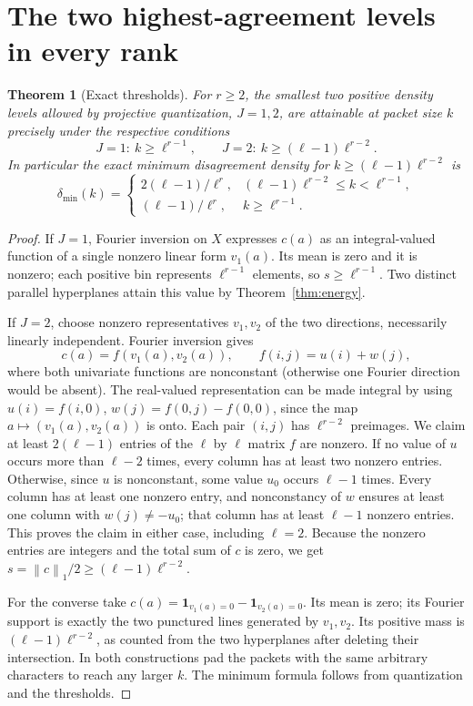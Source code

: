 \documentclass[11pt]{article}
\newtheorem{theorem}{Theorem}[section]
\theoremstyle{remark}\newtheorem{remark}[theorem]{Remark}
\newcommand{\1}{\mathbf 1}
\newcommand{\norm}[1]{\left\lVert#1\right\rVert}
\begin{document}
\section{The two highest-agreement levels in every rank}
\begin{theorem}[Exact thresholds]\label{thm:levels}
For $r\ge2$, the smallest two positive density levels allowed by projective quantization, $J=1,2$, are attainable at packet size $k$ precisely under the respective conditions
\[
 J=1:\ k\ge\ell^{r-1},\qquad
 J=2:\ k\ge(\ell-1)\ell^{r-2}.
\]
In particular the exact minimum disagreement density for $k\ge(\ell-1)\ell^{r-2}$ is
\[
 \delta_{\min}(k)=
 \begin{cases}
  2(\ell-1)/\ell^r,&(\ell-1)\ell^{r-2}\le k<\ell^{r-1},\\
  (\ell-1)/\ell^r,&k\ge\ell^{r-1}.
 \end{cases}
\]
\end{theorem}
\begin{proof}
If $J=1$, Fourier inversion on $X$ expresses $c(a)$ as an integral-valued function of a single nonzero linear form $v_1(a)$. Its mean is zero and it is nonzero; each positive bin represents $\ell^{r-1}$ elements, so $s\ge\ell^{r-1}$. Two distinct parallel hyperplanes attain this value by Theorem~\ref{thm:energy}.

If $J=2$, choose nonzero representatives $v_1,v_2$ of the two directions, necessarily linearly independent. Fourier inversion gives
\[
 c(a)=f(v_1(a),v_2(a)),\qquad f(i,j)=u(i)+w(j),
\]
where both univariate functions are nonconstant (otherwise one Fourier direction would be absent). The real-valued representation can be made integral by using $u(i)=f(i,0)$, $w(j)=f(0,j)-f(0,0)$, since the map $a\mapsto(v_1(a),v_2(a))$ is onto. Each pair $(i,j)$ has $\ell^{r-2}$ preimages. We claim at least $2(\ell-1)$ entries of the $\ell$ by $\ell$ matrix $f$ are nonzero. If no value of $u$ occurs more than $\ell-2$ times, every column has at least two nonzero entries. Otherwise, since $u$ is nonconstant, some value $u_0$ occurs $\ell-1$ times. Every column has at least one nonzero entry, and nonconstancy of $w$ ensures at least one column with $w(j)\ne-u_0$; that column has at least $\ell-1$ nonzero entries. This proves the claim in either case, including $\ell=2$. Because the nonzero entries are integers and the total sum of $c$ is zero, we get $s=\norm c_1/2\ge(\ell-1)\ell^{r-2}$.

For the converse take $c(a)=\1_{v_1(a)=0}-\1_{v_2(a)=0}$. Its mean is zero; its Fourier support is exactly the two punctured lines generated by $v_1,v_2$. Its positive mass is $(\ell-1)\ell^{r-2}$, as counted from the two hyperplanes after deleting their intersection. In both constructions pad the packets with the same arbitrary characters to reach any larger $k$. The minimum formula follows from quantization and the thresholds.
\end{proof}
\end{document}
